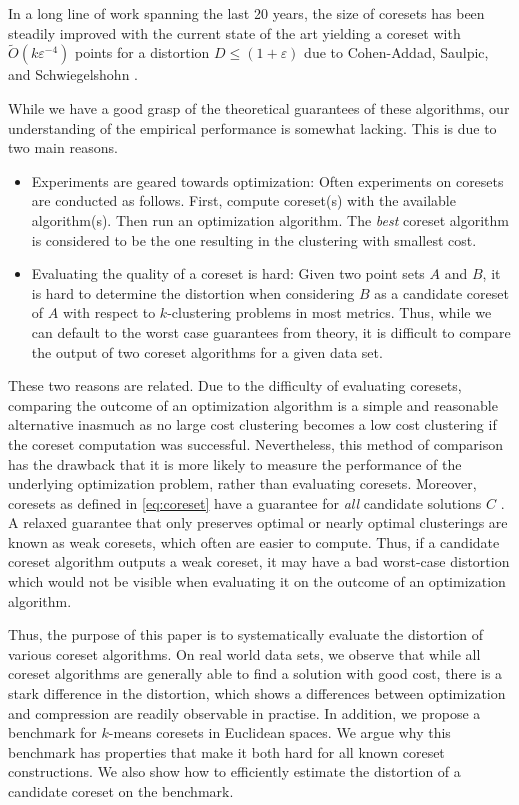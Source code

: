 In a long line of work spanning the last 20 years\cite{BecchettiBC0S19,BravermanJKW21,Chen09,FL11,FeldmanSS20,
HaM04,HaK07,huang2020coresets,BravermanJKW21,LS10,SohlerW18}, the size of coresets has been steadily improved with the current state of the art yielding a coreset with $\tilde{O}(k\varepsilon^{-4})$ points for a distortion $D\leq (1+\varepsilon)$ due to Cohen-Addad, Saulpic, and Schwiegelshohn \cite{Cohen-AddadSS21}.

While we have a good grasp of the theoretical guarantees of these algorithms, our understanding of the empirical performance is somewhat lacking.
This is due to two main reasons.
\begin{itemize}
\item Experiments are geared towards optimization: Often experiments on coresets are conducted as follows. First, compute coreset(s) with the available algorithm(s). Then run an optimization algorithm. The \emph{best} coreset algorithm is considered to be the one resulting in the clustering with smallest cost. 
\item Evaluating the quality of a coreset is hard: Given two point sets $A$ and $B$, it is hard to determine the distortion when considering $B$ as a candidate coreset of $A$ with respect to $k$-clustering problems in most metrics.  Thus, while we can default to the worst case guarantees from theory, it is difficult to compare the output of two coreset algorithms for a given data set. 
\end{itemize}

These two reasons are related. Due to the difficulty of evaluating coresets, comparing the outcome of an optimization algorithm is a simple and reasonable alternative inasmuch as no large cost clustering becomes a low cost clustering if the coreset computation was successful.
Nevertheless, this method of comparison has the drawback that it is more likely to measure the performance of the underlying optimization problem, rather than evaluating coresets. Moreover, coresets as defined in \cref{eq:coreset} have a guarantee for \emph{all} candidate solutions $C$ . A relaxed guarantee that only preserves optimal or nearly optimal clusterings are known as weak coresets, which often are easier to compute. Thus, if a candidate coreset algorithm outputs a weak coreset, it may have a bad worst-case distortion which would not be visible when evaluating it on the outcome of an optimization algorithm.

Thus, the purpose of this paper is to systematically evaluate the distortion of various coreset algorithms.
On real world data sets, we observe that while all coreset algorithms are generally able to find a solution with good cost, there is a stark difference in the distortion, which shows a differences between optimization and compression are readily observable in practise.
In addition, we propose a benchmark for $k$-means coresets in Euclidean spaces.
We argue why this benchmark has properties that make it both hard for all known coreset constructions. We also show how to efficiently estimate the distortion of a candidate coreset on the benchmark.
